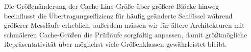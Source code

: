 Die Größenänderung der Cache-Line-Größe über größere Blöcke hinweg beeinflusst die
Übertragungseffizienz für häufig geänderte Schlüssel während größerer Messläufe erheblich, außerdem
müssen wir für ältere Architekturen mit schmäleren Cache-Größen die Prüfläufe sorgfältig anpassen,
damit größtmögliche Repräsentativität über möglichst viele Größenklassen gewährleistet bleibt.
